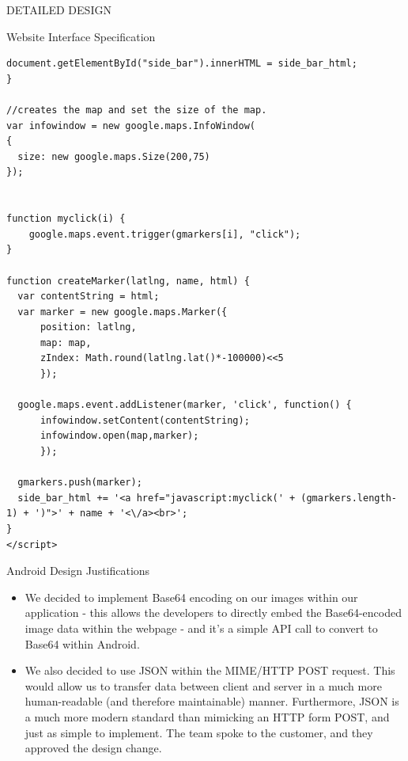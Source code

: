 \documentclass{article}
\begin{document}
\begin{section}{DETAILED DESIGN}
\begin{subsection}{Website Interface Specification}
\begin{lstlisting}[caption=Google Maps API Javascript Example]
	document.getElementById("side_bar").innerHTML = side_bar_html;
}

//creates the map and set the size of the map.
var infowindow = new google.maps.InfoWindow(
{ 
  size: new google.maps.Size(200,75)
});
  

function myclick(i) {
	google.maps.event.trigger(gmarkers[i], "click");
}

function createMarker(latlng, name, html) {
  var contentString = html;
  var marker = new google.maps.Marker({
      position: latlng,
      map: map,
      zIndex: Math.round(latlng.lat()*-100000)<<5
      });

  google.maps.event.addListener(marker, 'click', function() {
      infowindow.setContent(contentString); 
      infowindow.open(map,marker);
      });
  
  gmarkers.push(marker);
  side_bar_html += '<a href="javascript:myclick(' + (gmarkers.length-1) + ')">' + name + '<\/a><br>';
}
</script>
		\end{lstlisting}
	\end{subsection}
\end{section}
	
\begin{section}{Android Design Justifications}
	\begin{itemize}
		\item{We decided to implement Base64 encoding on our images within our application - this allows the developers to directly embed the Base64-encoded image data within the webpage - and it's a simple API call to convert to Base64 within Android.}
		\item{We also decided to use JSON within the MIME/HTTP POST request. This would allow us to transfer data between client and server in a much more human-readable (and therefore maintainable) manner. Furthermore, JSON is a much more modern standard than mimicking an HTTP form POST, and just as simple to implement. The team spoke to the customer, and they approved the design change.}
	\end{itemize}
\end{section}
\end{document}
